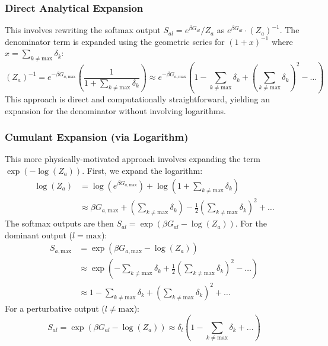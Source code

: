 \documentclass[12pt]{article}
\begin{document}
\subsubsection{Direct Analytical Expansion}
This involves rewriting the softmax output $S_{al} = e^{\beta G_{al}} / Z_a$ as $e^{\beta G_{al}} \cdot (Z_a)^{-1}$. The denominator term is expanded using the geometric series for $(1+x)^{-1}$ where $x = \sum_{k \neq \text{max}} \delta_k$:
\[
(Z_a)^{-1} = e^{-\beta G_{a, \text{max}}} \left( \frac{1}{1 + \sum_{k \neq \text{max}} \delta_k} \right) \approx e^{-\beta G_{a, \text{max}}} \left( 1 - \sum_{k \neq \text{max}} \delta_k + \left(\sum_{k \neq \text{max}} \delta_k\right)^2 - \dots \right)
\]
This approach is direct and computationally straightforward, yielding an expansion for the denominator without involving logarithms.

\subsubsection{Cumulant Expansion (via Logarithm)}
This more physically-motivated approach involves expanding the term $\exp(-\log(Z_a))$. First, we expand the logarithm:
\begin{align*}
\log(Z_a) &= \log\left(e^{\beta G_{a, \text{max}}}\right) + \log\left( 1 + \sum_{k \neq \text{max}} \delta_k \right) \\
&\approx \beta G_{a, \text{max}} + \left(\sum_{k \neq \text{max}} \delta_k\right) - \frac{1}{2}\left(\sum_{k \neq \text{max}} \delta_k\right)^2 + \dots
\end{align*}
The softmax outputs are then $S_{al} = \exp(\beta G_{al} - \log(Z_a))$. For the dominant output ($l=\text{max}$):
\begin{align*}
S_{a, \text{max}} &= \exp\left(\beta G_{a, \text{max}} - \log(Z_a)\right) \\
&\approx \exp\left( - \sum_{k \neq \text{max}} \delta_k + \frac{1}{2}\left(\sum_{k \neq \text{max}} \delta_k\right)^2 - \dots \right) \\
&\approx 1 - \sum_{k \neq \text{max}} \delta_k + \left(\sum_{k \neq \text{max}} \delta_k\right)^2 + \dots
\end{align*}
For a perturbative output ($l \neq \text{max}$):
\[
S_{al} = \exp(\beta G_{al} - \log(Z_a)) \approx \delta_l \left(1 - \sum_{k \neq \text{max}} \delta_k + \dots \right)
\]
\end{document}
